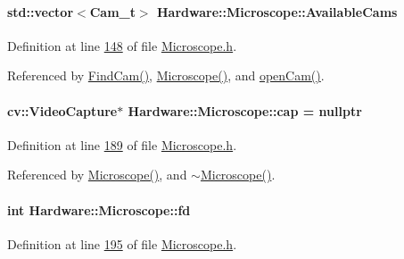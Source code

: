 \paragraph[{Available\+Cams}]{\setlength{\rightskip}{0pt plus 5cm}std\+::vector$<${\bf Cam\+\_\+t}$>$ Hardware\+::\+Microscope\+::\+Available\+Cams}\label{class_hardware_1_1_microscope_a49a52c74d900f217ed190d36b29ff27d}


Definition at line \hyperlink{_microscope_8h_source_l00148}{148} of file \hyperlink{_microscope_8h_source}{Microscope.\+h}.



Referenced by \hyperlink{_microscope_8cpp_source_l00293}{Find\+Cam()}, \hyperlink{_microscope_8cpp_source_l00012}{Microscope()}, and \hyperlink{_microscope_8cpp_source_l00167}{open\+Cam()}.

\hypertarget{class_hardware_1_1_microscope_a80c5ad94099d7b9d175e1a1cd4179fcd}{}
\paragraph[{cap}]{\setlength{\rightskip}{0pt plus 5cm}cv\+::\+Video\+Capture$\ast$ Hardware\+::\+Microscope\+::cap = nullptr\hspace{0.3cm}{\ttfamily [private]}}\label{class_hardware_1_1_microscope_a80c5ad94099d7b9d175e1a1cd4179fcd}


Definition at line \hyperlink{_microscope_8h_source_l00189}{189} of file \hyperlink{_microscope_8h_source}{Microscope.\+h}.



Referenced by \hyperlink{_microscope_8cpp_source_l00021}{Microscope()}, and \hyperlink{_microscope_8cpp_source_l00032}{$\sim$\+Microscope()}.

\hypertarget{class_hardware_1_1_microscope_a2ca84cff524b286b3fb452c4bd813303}{}
\paragraph[{fd}]{\setlength{\rightskip}{0pt plus 5cm}int Hardware\+::\+Microscope\+::fd\hspace{0.3cm}{\ttfamily [private]}}\label{class_hardware_1_1_microscope_a2ca84cff524b286b3fb452c4bd813303}


Definition at line \hyperlink{_microscope_8h_source_l00195}{195} of file \hyperlink{_microscope_8h_source}{Microscope.\+h}.



